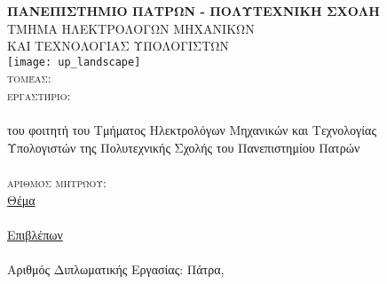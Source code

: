 \begin{titlepage}
\begin{center}
\textsc{\textbf{\large ΠΑΝΕΠΙΣΤΗΜΙΟ ΠΑΤΡΩΝ - ΠΟΛΥΤΕΧΝΙΚΗ ΣΧΟΛΗ}\\
\large ΤΜΗΜΑ ΗΛΕΚΤΡΟΛΟΓΩΝ ΜΗΧΑΝΙΚΩΝ\\ΚΑΙ ΤΕΧΝΟΛΟΓΙΑΣ ΥΠΟΛΟΓΙΣΤΩΝ}\\

\texttt{[image: up\_landscape]}\\  

\textsc{\Large τομέας: \division \\
εργαστήριο: \lab }\\[1cm]

\textsc{\uline{\LARGE{\shortdoctitle }}}\\ [0.5cm]
του φοιτητή του Τμήματος Ηλεκτρολόγων Μηχανικών και Τεχνολογίας\\
Υπολογιστών της Πολυτεχνικής Σχολής  του Πανεπιστημίου Πατρών\\[1cm]

\textsc{\LARGE \me }\\[0.5cm]
\textsc{\Large αριθμός μητρώου: \studnum}\\[1cm]

\uline{\large Θέμα}\\[0.5cm]
\textbf{\large \doctitle }\\[1cm]
\uline{\large Επιβλέπων}\\[0.5cm]
\large \suptitle \, \supname \\[1cm]
\large{Αριθμός Διπλωματικής Εργασίας: }\hspace{3cm}
\vfill
\large{Πάτρα, \monthyear}
\end{center}
\end{titlepage}
